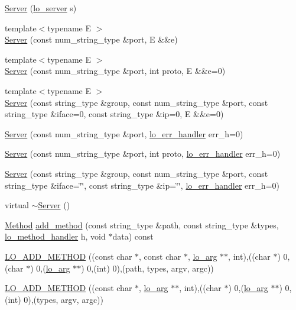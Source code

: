 \begin{DoxyCompactItemize}
\item 
\hyperlink{classlo_1_1Server_abf695f157836b714e1e250b47bc018b3}{Server} (\hyperlink{lo__types_8h_a59067bf50cf8abb4371da6f03c9036c9}{lo\+\_\+server} s)
\item 
{\footnotesize template$<$typename E $>$ }\\\hyperlink{classlo_1_1Server_a65262c3e0bebd348fe07474dfee59150}{Server} (const num\+\_\+string\+\_\+type \&port, E \&\&e)
\item 
{\footnotesize template$<$typename E $>$ }\\\hyperlink{classlo_1_1Server_a56985c15c0efa0c1d61ffb25bbdc47a3}{Server} (const num\+\_\+string\+\_\+type \&port, int proto, E \&\&e=0)
\item 
{\footnotesize template$<$typename E $>$ }\\\hyperlink{classlo_1_1Server_a93a05e892f41d45d1069c77a15a2c16d}{Server} (const string\+\_\+type \&group, const num\+\_\+string\+\_\+type \&port, const string\+\_\+type \&iface=0, const string\+\_\+type \&ip=0, E \&\&e=0)
\item 
\hyperlink{classlo_1_1Server_a357459bdcea45875a1485b26e9bfcfaa}{Server} (const num\+\_\+string\+\_\+type \&port, \hyperlink{lo__types_8h_aa5d2e4aa0ff9d4459fcc76e7ed5839fc}{lo\+\_\+err\+\_\+handler} err\+\_\+h=0)
\item 
\hyperlink{classlo_1_1Server_a499a9175c5908a9947cc413316d7fb3d}{Server} (const num\+\_\+string\+\_\+type \&port, int proto, \hyperlink{lo__types_8h_aa5d2e4aa0ff9d4459fcc76e7ed5839fc}{lo\+\_\+err\+\_\+handler} err\+\_\+h=0)
\item 
\hyperlink{classlo_1_1Server_a260c1a07f5a0af5057ab97b8c0efe026}{Server} (const string\+\_\+type \&group, const num\+\_\+string\+\_\+type \&port, const string\+\_\+type \&iface=\char`\"{}\char`\"{}, const string\+\_\+type \&ip=\char`\"{}\char`\"{}, \hyperlink{lo__types_8h_aa5d2e4aa0ff9d4459fcc76e7ed5839fc}{lo\+\_\+err\+\_\+handler} err\+\_\+h=0)
\item 
virtual \hyperlink{classlo_1_1Server_a207eee1c209e04d2fc683ecb8ce86470}{$\sim$\+Server} ()
\item 
\hyperlink{classlo_1_1Method}{Method} \hyperlink{classlo_1_1Server_a14113ef693e50c2b8569ae4c12d02e0f}{add\+\_\+method} (const string\+\_\+type \&path, const string\+\_\+type \&types, \hyperlink{lo__types_8h_a3b1c86c0925d05e13b5438ce8fe80a6c}{lo\+\_\+method\+\_\+handler} h, void $\ast$data) const 
\item 
\hyperlink{classlo_1_1Server_aadd89f1021f8437246bc640834ce7522}{L\+O\+\_\+\+A\+D\+D\+\_\+\+M\+E\+T\+H\+O\+D} ((const char $\ast$, const char $\ast$, \hyperlink{unionlo__arg}{lo\+\_\+arg} $\ast$$\ast$, int),((char $\ast$) 0,(char $\ast$) 0,(\hyperlink{unionlo__arg}{lo\+\_\+arg} $\ast$$\ast$) 0,(int) 0),(path, types, argv, argc))
\item 
\hyperlink{classlo_1_1Server_a79293c21b7b389e32178d91f9774021f}{L\+O\+\_\+\+A\+D\+D\+\_\+\+M\+E\+T\+H\+O\+D} ((const char $\ast$, \hyperlink{unionlo__arg}{lo\+\_\+arg} $\ast$$\ast$, int),((char $\ast$) 0,(\hyperlink{unionlo__arg}{lo\+\_\+arg} $\ast$$\ast$) 0,(int) 0),(types, argv, argc))
\end{DoxyCompactItemize}


